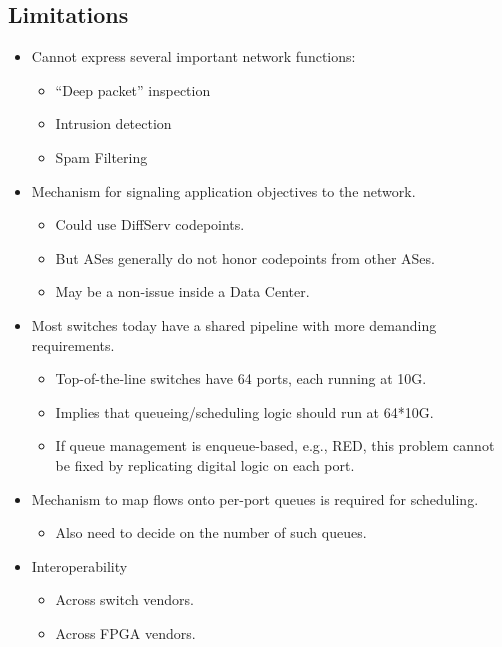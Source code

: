 {\begin{multicols}{2}
\section*{Limitations}
\begin{itemize}
\item Cannot express several important network functions:
      \begin{itemize}
      \item ``Deep packet'' inspection
      \item Intrusion detection
      \item Spam Filtering
      \end{itemize}
\item Mechanism for signaling application objectives to the network.
      \begin{itemize}
      \item Could use DiffServ codepoints.
      \item But ASes generally do not honor codepoints from other ASes.
      \item May be a non-issue inside a Data Center.
      \end{itemize}
\item Most switches today have a shared pipeline with more demanding requirements.
      \begin{itemize}
      \item Top-of-the-line switches have 64 ports, each running at 10G.
      \item Implies that queueing/scheduling logic should run at 64*10G.
      \item If queue management is enqueue-based, e.g., RED, this problem cannot be fixed by replicating digital logic on each port.
      \end{itemize}
\item Mechanism to map flows onto per-port queues is required for scheduling.
      \begin{itemize}
      \item Also need to decide on the number of such queues.
      \end{itemize}
\item Interoperability
      \begin{itemize}
      \item Across switch vendors.
      \item Across FPGA vendors.
      \end{itemize}
\end{itemize}

\end{multicols}
}
